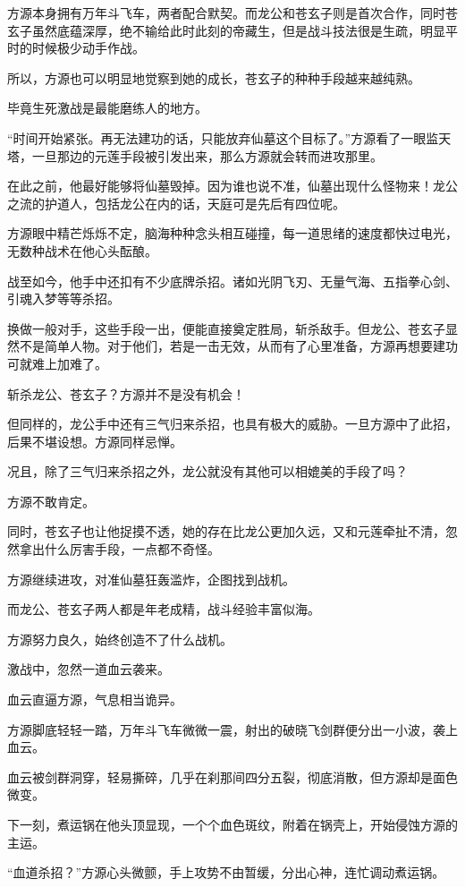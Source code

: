 \begin{this_body}
方源本身拥有万年斗飞车，两者配合默契。而龙公和苍玄子则是首次合作，同时苍玄子虽然底蕴深厚，绝不输给此时此刻的帝藏生，但是战斗技法很是生疏，明显平时的时候极少动手作战。

所以，方源也可以明显地觉察到她的成长，苍玄子的种种手段越来越纯熟。

毕竟生死激战是最能磨练人的地方。

“时间开始紧张。再无法建功的话，只能放弃仙墓这个目标了。”方源看了一眼监天塔，一旦那边的元莲手段被引发出来，那么方源就会转而进攻那里。

在此之前，他最好能够将仙墓毁掉。因为谁也说不准，仙墓出现什么怪物来！龙公之流的护道人，包括龙公在内的话，天庭可是先后有四位呢。

方源眼中精芒烁烁不定，脑海种种念头相互碰撞，每一道思绪的速度都快过电光，无数种战术在他心头酝酿。

战至如今，他手中还扣有不少底牌杀招。诸如光阴飞刃、无量气海、五指拳心剑、引魂入梦等等杀招。

换做一般对手，这些手段一出，便能直接奠定胜局，斩杀敌手。但龙公、苍玄子显然不是简单人物。对于他们，若是一击无效，从而有了心里准备，方源再想要建功可就难上加难了。

斩杀龙公、苍玄子？方源并不是没有机会！

但同样的，龙公手中还有三气归来杀招，也具有极大的威胁。一旦方源中了此招，后果不堪设想。方源同样忌惮。

况且，除了三气归来杀招之外，龙公就没有其他可以相媲美的手段了吗？

方源不敢肯定。

同时，苍玄子也让他捉摸不透，她的存在比龙公更加久远，又和元莲牵扯不清，忽然拿出什么厉害手段，一点都不奇怪。

方源继续进攻，对准仙墓狂轰滥炸，企图找到战机。

而龙公、苍玄子两人都是年老成精，战斗经验丰富似海。

方源努力良久，始终创造不了什么战机。

激战中，忽然一道血云袭来。

血云直逼方源，气息相当诡异。

方源脚底轻轻一踏，万年斗飞车微微一震，射出的破晓飞剑群便分出一小波，袭上血云。

血云被剑群洞穿，轻易撕碎，几乎在刹那间四分五裂，彻底消散，但方源却是面色微变。

下一刻，煮运锅在他头顶显现，一个个血色斑纹，附着在锅壳上，开始侵蚀方源的主运。

“血道杀招？”方源心头微颤，手上攻势不由暂缓，分出心神，连忙调动煮运锅。


\end{this_body}
